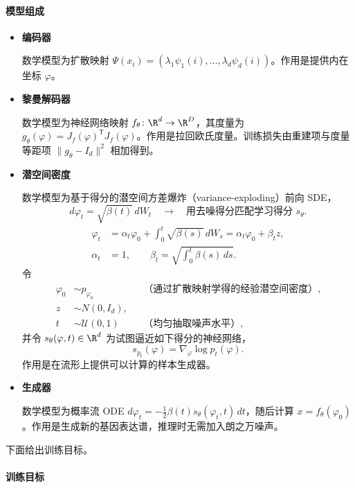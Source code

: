 \paragraph{模型组成}

\begin{itemize}
  \item \textbf{编码器}\par
  数学模型为扩散映射 $\Psi(x_i)=(\lambda_1\psi_1(i),\ldots,\lambda_d\psi_d(i))$。作用是提供内在坐标 $\varphi$。

  \item \textbf{黎曼解码器}\par
  数学模型为神经网络映射 $f_\theta\colon\R^d\to\R^D$，其度量为 $g_\theta(\varphi)=J_f(\varphi)^{\mathsf T}J_f(\varphi)$。作用是拉回欧氏度量。训练损失由重建项与度量等距项 $\lVert g_\theta-I_d\rVert^2$ 相加得到。

  \item \textbf{潜空间密度}\par
  数学模型为基于得分的潜空间方差爆炸（variance-exploding）前向 SDE，
  \[
    d\varphi_t=\sqrt{\beta(t)}\,dW_t
    \quad\longrightarrow\quad
    \text{用去噪得分匹配学习得分 }s_\theta.
  \]
  \[
    \begin{aligned}
    \varphi_t
      &=\alpha_t\varphi_0+\int_0^t\sqrt{\beta(s)}\,dW_s
       =\alpha_t\varphi_0+\beta_t z,\\
    \alpha_t&=1,\qquad \beta_t=\sqrt{\int_0^t\beta(s)\,ds}.
    \end{aligned}
  \]
  令
  \[
    \begin{aligned}
     \varphi_0 &\sim p_{\varphi_0} &&\text{（通过扩散映射学得的经验潜空间密度）},\\
     z &\sim N(0,I_d),\\
     t &\sim \mathcal U(0,1) &&\text{（均匀抽取噪声水平）},
    \end{aligned}
  \]
  并令 $s_\theta(\varphi,t)\in\R^d$ 为试图逼近如下得分的神经网络，
  \[
    s_{p_t}(\varphi)=\nabla_\varphi\log p_t(\varphi).
  \]
  作用是在流形上提供可以计算的样本生成器。

  \item \textbf{生成器}\par
  数学模型为概率流 ODE $d\varphi_t=-\frac12\beta(t)s_\theta(\varphi_t,t)\,dt$，随后计算 $x=f_\theta(\varphi_0)$。作用是生成新的基因表达谱，推理时无需加入朗之万噪声。
\end{itemize}

下面给出训练目标。
\paragraph{训练目标}

